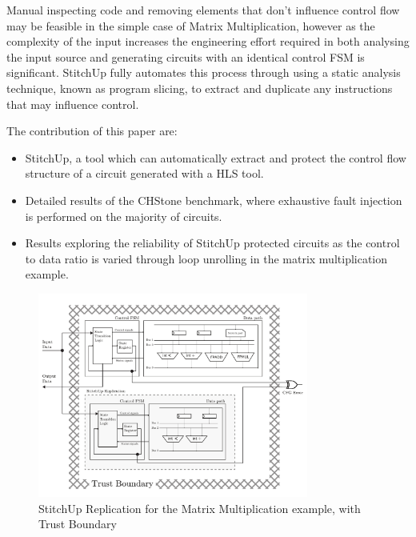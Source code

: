 Manual inspecting code and removing elements that don't influence control flow
may be feasible in the simple case of Matrix Multiplication, however as the complexity of the input increases
the engineering effort required in both analysing the input source and generating circuits with an identical control FSM is
significant.
StitchUp fully automates this process through using a static analysis technique, known as program slicing, to extract
and duplicate any instructions that may influence control.

The contribution of this paper are:
\begin{itemize}
\item StitchUp, a tool which can automatically extract and protect the control flow structure of a circuit generated with a HLS tool.
\item Detailed results of the CHStone benchmark, where exhaustive fault injection is performed on the majority of circuits.
\item Results exploring the reliability of StitchUp protected circuits as the control to data ratio is varied through
loop unrolling in the matrix multiplication example.

\end{itemize}

\begin{figure}[!t]
\centering
\includegraphics[width=3.5in]{./imgs/HLSArch.pdf}
\caption{StitchUp Replication for the Matrix Multiplication example, with Trust Boundary}
\label{fig:HLSArch}
\end{figure}




